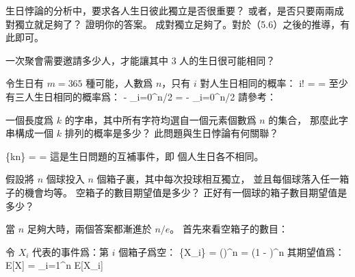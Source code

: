 \startEXERCISE \DIFFICULT
生日悖論的分析中，要求各人生日彼此獨立是否很重要？
或者，是否只要兩兩成對獨立就足夠了？
證明你的答案。
\stopEXERCISE
\startANSWER
成對獨立足夠了。對於（5.6）之後的推導，有此即可。
\stopANSWER

\startEXERCISE \DIFFICULT
一次聚會需要邀請多少人，才能讓其中 3 人的生日很可能相同？
\stopEXERCISE

\startANSWER
令生日有 $m=365$ 種可能，人數爲 $n$，只有 $i$ 對人生日相同的概率：
\startsplitformula\startmathalignment
\NC \NC
{}
     {i!} \NR
\NC \NC \qquad {}  \cdots {} \NR
\NC = \NC {}
           \NR
\NC = \NC {} \NR
\stopmathalignment\stopsplitformula
至少有三人生日相同的概率爲：
\startsplitformula\startmathalignment
\NC {} - \sum_{i=0}^{\lfloor n/2\rfloor} \NR
\NC =  - \sum_{i=0}^{\lfloor n/2\rfloor}
               \NR
\stopmathalignment\stopsplitformula
請參考：
\stopANSWER

\startEXERCISE \DIFFICULT
一個長度爲 $k$ 的字串，其中所有字符均選自一個元素個數爲 $n$ 的集合，
那麼此字串構成一個 $k$ 排列的概率是多少？
此問題與生日悖論有何關聯？
\stopEXERCISE

\startANSWER
\startsplitformula\startmathalignment
\NC \NC \Pr\{kn\} \NR
\NC = \cdot {} \cdot {} \cdots {} \NR
\NC =\NC {} \NR
\stopmathalignment\stopsplitformula
這是生日問題的互補事件，即  個人生日各不相同。
\stopANSWER

\startEXERCISE \DIFFICULT
假設將 $n$ 個球投入 $n$ 個箱子裏，其中每次投球相互獨立，
並且每個球落入任一箱子的機會均等。
空箱子的數目期望值是多少？
正好有一個球的箱子數目期望值是多少？
\stopEXERCISE

\startANSWER
當 $n$ 足夠大時，兩個答案都漸進於 $n/e$。
首先來看空箱子的數目：

令 $X_i$ 代表的事件爲：第 $i$ 個箱子爲空：
\startsplitformula\startmathalignment
\NC \Pr\{X_i\} \NC = \left(\right)^n\NR
\NC \NC = \left(1 - \right)^n \NR
\NC \NC \approx {} \NR
\stopmathalignment\stopsplitformula
其期望值爲：
\startformula
E[X] = \sum_{i=1}^n E[X_i] \approx {}
\stopformula

